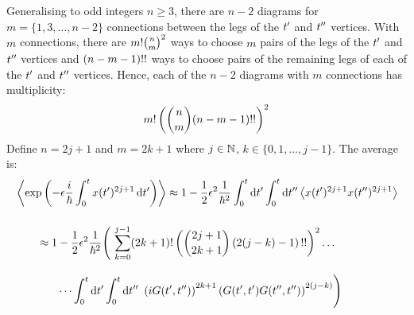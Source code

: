 Generalising to odd integers $n \geq 3$, there are $n - 2$ diagrams for $m =
  \{1, 3, \dots, n - 2\}$ connections between the legs of the ${t^{\prime}}$ and ${t^{\prime\prime}}$
vertices.
With $m$ connections, there are $m{!} \binom{n}{m}^2$ ways to choose $m$
pairs of the legs of the ${t^{\prime}}$ and ${t^{\prime\prime}}$ vertices and $(n - m - 1){!!}$
ways to choose pairs of the remaining legs of each of the ${t^{\prime}}$ and ${t^{\prime\prime}}$
vertices.
Hence, each of the $n - 2$ diagrams with $m$ connections has multiplicity:
\begin{equation*}
  m{!} \left( \binom{n}{m} (n - m - 1){!!} \right)^2
\end{equation*}
Define $n = 2j + 1$ and $m = 2k + 1$ where $j \in \mathbb{N}$, $k \in \{0, 1, \dots, j
  - 1\}$.
The average is:
\begin{align*}
   & \left\langle{\exp\left(-\epsilon\frac{i}{\hbar}\int_0^t x({t^{\prime}})^{2j + 1} \,\text{d}{}{{t^{\prime}}}\right)}\right\rangle
  \approx 1
  - \frac{1}{2}\epsilon^2\frac{1}{\hbar^2}
  \int_0^t\text{d}{}{{t^{\prime}}} \int_0^t\text{d}{}{{t^{\prime\prime}}}
  \left\langle{x({t^{\prime}})^{2j + 1} x({t^{\prime\prime}})^{2j + 1}}\right\rangle
  \\[3ex]
   & \qquad \approx 1
  - \frac{1}{2}\epsilon^2\frac{1}{\hbar^2}\Biggl(\
  \sum_{k=0}^{j - 1}
  (2k + 1){!} \left( \binom{2j + 1}{2k + 1} \left(2(j - k) - 1\right){!!} \right)^2
  \dots
  \\[2ex]
   & \qquad\qquad \dots
  \int_0^t\text{d}{}{{t^{\prime}}} \int_0^t\text{d}{}{{t^{\prime\prime}}}\
  \left(iG({t^{\prime}}, {t^{\prime\prime}})\right)^{2k + 1}
  \left(G({t^{\prime}}, {t^{\prime}}) G({t^{\prime\prime}}, {t^{\prime\prime}})\right)^{2(j - k)}
  \Biggr)
\end{align*}
